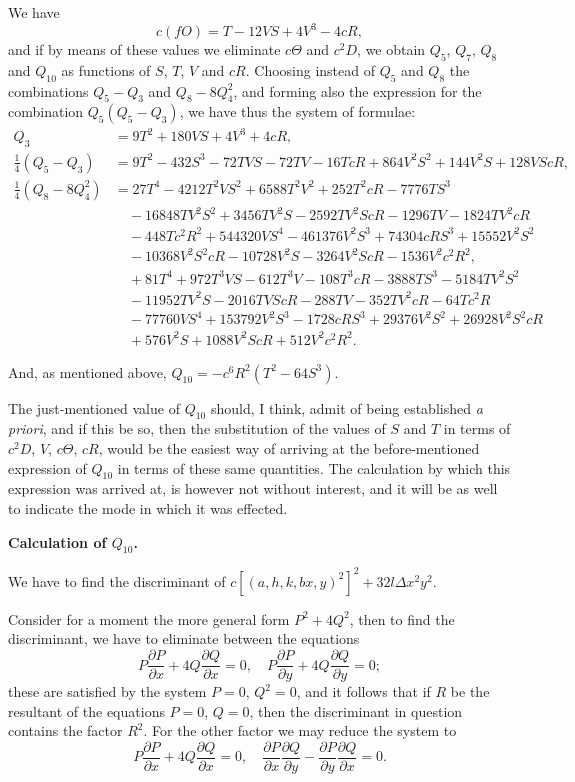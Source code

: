\documentclass[11pt,a4paper]{article}
\theoremstyle{definition}
\begin{document}
\newpage

We have
\[
c(fO) = T - 12VS + 4V^3 - 4cR,
\]
and if by means of these values we eliminate $c\Theta$ and $c^2D$, we obtain $Q_5$, $Q_7$, $Q_8$ and $Q_{10}$ as functions of $S$, $T$, $V$ and $cR$. Choosing instead of $Q_5$ and $Q_8$ the combinations $Q_5 - Q_3$ and $Q_8 - 8Q_4^2$, and forming also the expression for the combination $Q_5(Q_5 - Q_3)$, we have thus the system of formulae:
\begin{align*}
Q_3 &= 9T^2 + 180VS + 4V^3 + 4cR,\\
\tfrac{1}{4}(Q_5 - Q_3) &= 9T^2 - 432S^3 - 72TVS - 72TV - 16TcR + 864V^2S^2 + 144V^2S + 128VScR,\\
\tfrac{1}{4}(Q_8 - 8Q_4^2) &= 27T^4 - 4212T^2VS^2 + 6588T^2V^2 + 252T^2cR - 7776TS^3\\
&\quad - 16848TV^2S^2 + 3456TV^2S - 2592TV^2ScR - 1296TV - 1824TV^2cR\\
&\quad - 448Tc^2R^2 + 544320VS^4 - 461376V^2S^3 + 74304cRS^3 + 15552V^2S^2\\
&\quad - 10368V^2S^2cR - 10728V^2S - 3264V^2ScR - 1536V^2c^2R^2,\\
&\quad + 81T^4 + 972T^3VS - 612T^3V - 108T^3cR - 3888TS^3 - 5184TV^2S^2\\
&\quad - 11952TV^2S - 2016TVScR - 288TV - 352TV^2cR - 64Tc^2R\\
&\quad - 77760VS^4 + 153792V^2S^3 - 1728cRS^3 + 29376V^2S^2 + 26928V^2S^2cR\\
&\quad + 576V^2S + 1088V^2ScR + 512V^2c^2R^2.
\end{align*}

And, as mentioned above, $Q_{10} = -c^6R^2(T^2 - 64S^3)$.

The just-mentioned value of $Q_{10}$ should, I think, admit of being established \textit{a priori}, and if this be so, then the substitution of the values of $S$ and $T$ in terms of $c^2D$, $V$, $c\Theta$, $cR$, would be the easiest way of arriving at the before-mentioned expression of $Q_{10}$ in terms of these same quantities. The calculation by which this expression was arrived at, is however not without interest, and it will be as well to indicate the mode in which it was effected.

\newpage

\noindent\textbf{Calculation of $Q_{10}$.}

We have to find the discriminant of $c[(a,h,k,b x,y)^2]^2 + 32l\Delta x^2y^2$.

Consider for a moment the more general form $P^2 + 4Q^2$, then to find the discriminant, we have to eliminate between the equations
\[
P\frac{\partial P}{\partial x} + 4Q\frac{\partial Q}{\partial x} = 0,\quad P\frac{\partial P}{\partial y} + 4Q\frac{\partial Q}{\partial y} = 0;
\]
these are satisfied by the system $P = 0$, $Q^2 = 0$, and it follows that if $R$ be the resultant of the equations $P = 0$, $Q = 0$, then the discriminant in question contains the factor $R^2$. For the other factor we may reduce the system to
\[
P\frac{\partial P}{\partial x} + 4Q\frac{\partial Q}{\partial x} = 0,\quad \frac{\partial P}{\partial x}\frac{\partial Q}{\partial y} - \frac{\partial P}{\partial y}\frac{\partial Q}{\partial x} = 0.
\]
\end{document}
